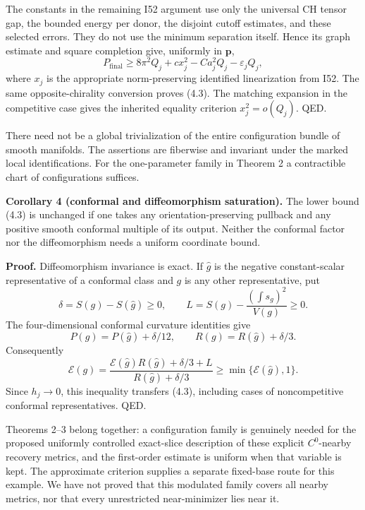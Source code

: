 \documentclass[
  10pt,
]{article}
\begin{document}
The constants in the remaining I52 argument use only the universal CH
tensor gap, the bounded energy per donor, the disjoint cutoff estimates,
and these selected errors. They do not use the minimum separation
itself. Hence its graph estimate and square completion give, uniformly
in \(\mathbf p\), \[
 P_{\mathrm{final}}\ge8\pi^2Q_j+c x_j^2
                         -C a_j^2Q_j-\varepsilon_jQ_j,        \tag{4.4}
\] where \(x_j\) is the appropriate norm-preserving identified
linearization from I52. The same opposite-chirality conversion proves
(4.3). The matching expansion in the competitive case gives the
inherited equality criterion \(x_j^2=o(Q_j)\). QED.

There need not be a global trivialization of the entire configuration
bundle of smooth manifolds. The assertions are fiberwise and invariant
under the marked local identifications. For the one-parameter family in
Theorem 2 a contractible chart of configurations suffices.

\textbf{Corollary 4 (conformal and diffeomorphism saturation).} The
lower bound (4.3) is unchanged if one takes any orientation-preserving
pullback and any positive smooth conformal multiple of its output.
Neither the conformal factor nor the diffeomorphism needs a uniform
coordinate bound.

\textbf{Proof.} Diffeomorphism invariance is exact. If \(\widehat g\) is
the negative constant-scalar representative of a conformal class and
\(g\) is any other representative, put \[
 \delta=S(g)-S(\widehat g)\ge0,\qquad
 L=S(g)-\frac{(\int s_g)^2}{V(g)}\ge0.
\] The four-dimensional conformal curvature identities give \[
 P(g)=P(\widehat g)+\delta/12,\qquad
 R(g)=R(\widehat g)+\delta/3.
\] Consequently \[
 \mathcal E(g)=
 \frac{\mathcal E(\widehat g)R(\widehat g)+\delta/3+L}
      {R(\widehat g)+\delta/3}
 \ge \min\{\mathcal E(\widehat g),1\}.                         \tag{4.5}
\] Since \(h_j\to0\), this inequality transfers (4.3), including cases
of noncompetitive conformal representatives. QED.

Theorems 2--3 belong together: a configuration family is genuinely
needed for the proposed uniformly controlled exact-slice description of
these explicit \(C^0\)-nearby recovery metrics, and the first-order
estimate is uniform when that variable is kept. The approximate
criterion supplies a separate fixed-base route for this example. We have
not proved that this modulated family covers all nearby metrics, nor
that every unrestricted near-minimizer lies near it.
\end{document}
